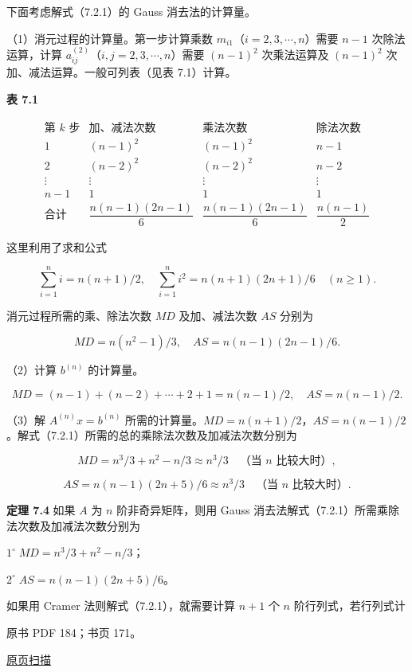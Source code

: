 \documentclass[
  10pt,
  fontset=fandol]{ctexart}
\begin{document}
下面考虑解式（7.2.1）的 Gauss 消去法的计算量。

（1）消元过程的计算量。第一步计算乘数 \(m_{i1}\)（\(i=2,3,\cdots,n\)）需要 \(n-1\) 次除法运算，计算 \(a_{ij}^{(2)}\)（\(i,j=2,3,\cdots,n\)）需要 \((n-1)^2\) 次乘法运算及 \((n-1)^2\) 次加、减法运算。一般可列表（见表 7.1）计算。

\textbf{表 7.1}

\[
\begin{array}{c|c|c|c}
\text{第 }k\text{ 步}&\text{加、减法次数}&\text{乘法次数}&\text{除法次数}\\\hline
1&(n-1)^2&(n-1)^2&n-1\\
2&(n-2)^2&(n-2)^2&n-2\\
\vdots&\vdots&\vdots&\vdots\\
n-1&1&1&1\\\hline
\text{合计}&\dfrac{n(n-1)(2n-1)}{6}&\dfrac{n(n-1)(2n-1)}{6}&\dfrac{n(n-1)}{2}
\end{array}
\]

这里利用了求和公式

\[\sum_{i=1}^{n}i=n(n+1)/2,\quad \sum_{i=1}^{n}i^2=n(n+1)(2n+1)/6\quad(n\ge1).\]

消元过程所需的乘、除法次数 \(MD\) 及加、减法次数 \(AS\) 分别为

\[MD=n(n^2-1)/3,\quad AS=n(n-1)(2n-1)/6.\]

（2）计算 \(b^{(n)}\) 的计算量。

\[MD=(n-1)+(n-2)+\cdots+2+1=n(n-1)/2,\quad AS=n(n-1)/2.\]

（3）解 \(A^{(n)}x=b^{(n)}\) 所需的计算量。\(MD=n(n+1)/2\)，\(AS=n(n-1)/2\)。解式（7.2.1）所需的总的乘除法次数及加减法次数分别为

\[MD=n^3/3+n^2-n/3\approx n^3/3\quad\text{（当 $n$ 比较大时）},\]

\[AS=n(n-1)(2n+5)/6\approx n^3/3\quad\text{（当 $n$ 比较大时）}.\]

\textbf{定理 7.4} 如果 \(A\) 为 \(n\) 阶非奇异矩阵，则用 Gauss 消去法解式（7.2.1）所需乘除法次数及加减法次数分别为

\(1^\circ\;MD=n^3/3+n^2-n/3\)；

\(2^\circ\;AS=n(n-1)(2n+5)/6\)。

如果用 Cramer 法则解式（7.2.1），就需要计算 \(n+1\) 个 \(n\) 阶行列式，若行列式计

\clearpage

原书 PDF 184；书页 171。

\href{/Users/xiangjunfeng/Desktop/数值计算专用/numerical-analysis/book/source-images/pdf-184.jpeg}{原页扫描}
\end{document}
